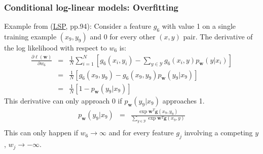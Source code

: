 \documentclass[ignorenonframetext,plain,fleqn]{beamer}
\renewcommand{\vec}{\mathbf}
\begin{document}
\begin{frame}\frametitle{Conditional log-linear models: Overfitting}
Example from
(\href{http://www.morganclaypool.com/doi/abs/10.2200/S00361ED1V01Y201105HLT013}{LSP},
pp.94): Consider a feature $g_6$ with value 1 on a single training
example $(x_9, y_9)$ and 0 for every other $(x, y)$ pair.  The
derivative of the log likelihood with respect to $w_6$
is: \begin{eqnarray*} \frac{\partial \ell(\vec{w})}{\partial w_6} &=&
  \frac{1}{N} \sum_{i=1}^N \left[ g_6(x_i, y_i) -
    \sum_{y\in\mathcal{Y}} g_6(x_i, y) p_\vec{w}(y|x_i) \right]
  \\ &=& \frac{1}{N} \left[g_6(x_9, y_9) - g_6(x_9, y_9)
    p_\vec{w}(y_9|x_9)\right] \\ &=& \frac{1}{N} \left[ 1 -
    p_\vec{w}(y_9|x_9) \right]
\end{eqnarray*}
This derivative can only approach 0 if $p_\vec{w}(y_9|x_9)$
approaches 1.\begin{eqnarray*}
p_\vec{w}(y_9|x_9) &=& \frac{\exp \vec{w}^T \vec{g}(x_9,y_9)}
{\sum_{y\in\mathcal{Y}} \exp \vec{w}^T \vec{g}(x_9,y)} \\
\end{eqnarray*}
This can only happen if $w_6\rightarrow\infty$ and for every feature
$g_j$ involving a competing $y$, $w_j\rightarrow-\infty$.
\end{frame}
\end{document}
